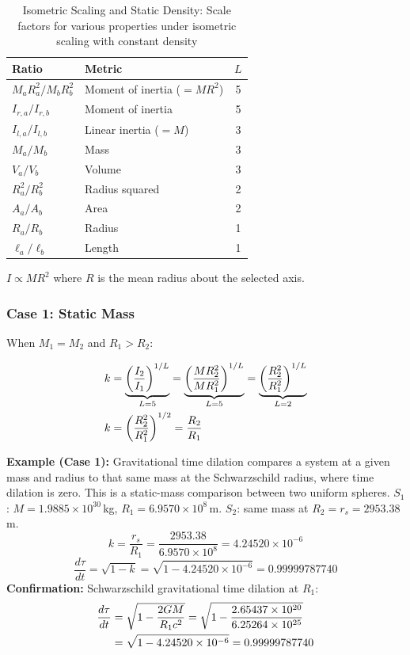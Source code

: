 \begin{table}[h]
\centering
\caption{Isometric Scaling and Static Density: Scale factors for various properties under isometric scaling with constant density}
\label{tab:scaling_reference}
\begin{tabular}{llc}
\toprule
Ratio & Metric & $L$ \\
\midrule
$M_a R_a^2 / M_b R_b^2$ & Moment of inertia ($=MR^2$) & 5 \\
$I_{r,a}/I_{r,b}$ & Moment of inertia & 5 \\
$I_{l,a}/I_{l,b}$ & Linear inertia ($=M$) & 3 \\
$M_a/M_b$ & Mass & 3 \\
$V_a/V_b$ & Volume & 3 \\
$R_a^2/R_b^2$ & Radius squared & 2 \\
$A_a/A_b$ & Area & 2 \\
$R_a/R_b$ & Radius & 1 \\
$\ell_a/\ell_b$ & Length & 1 \\
\bottomrule
\end{tabular}
\end{table}

$I \propto MR^2$ where $R$ is the mean radius about the selected axis.

\subsubsection*{Case 1: Static Mass}

When $M_1 = M_2$ and $R_1 > R_2$:

\begin{align}
k &= \underbrace{\left(\frac{I_2}{I_1}\right)^{1/L}}_{L=5} = \underbrace{\left(\frac{M R_2^2}{M R_1^2}\right)^{1/L}}_{L=5} = \underbrace{\left(\frac{R_2^2}{R_1^2}\right)^{1/L}}_{L=2} \notag \\
k &= \left(\frac{R_2^2}{R_1^2}\right)^{1/2} = \frac{R_2}{R_1}
\end{align}

\begin{mdframed}
\textbf{Example (Case 1):} Gravitational time dilation compares a system at a given mass and radius to that same mass at the Schwarzschild radius, where time dilation is zero. This is a static-mass comparison between two uniform spheres. $S_1$: $M = 1.9885 \times 10^{30}$\,kg, $R_1 = 6.9570 \times 10^{8}$\,m. $S_2$: same mass at $R_2 = r_s = 2953.38$\,m.
\[
k = \frac{r_s}{R_1} = \frac{2953.38}{6.9570 \times 10^{8}} = 4.24520 \times 10^{-6}
\]
\[
\frac{d\tau}{dt} = \sqrt{1 - k} = \sqrt{1 - 4.24520 \times 10^{-6}} = 0.99999787740
\]
\textbf{Confirmation:} Schwarzschild gravitational time dilation at $R_1$:
\begin{align}
\frac{d\tau}{dt} &= \sqrt{1 - \frac{2GM}{R_1 c^2}} = \sqrt{1 - \frac{2.65437 \times 10^{20}}{6.25264 \times 10^{25}}} \notag \\
&= \sqrt{1 - 4.24520 \times 10^{-6}} = 0.99999787740 \notag
\end{align}
\end{mdframed}


